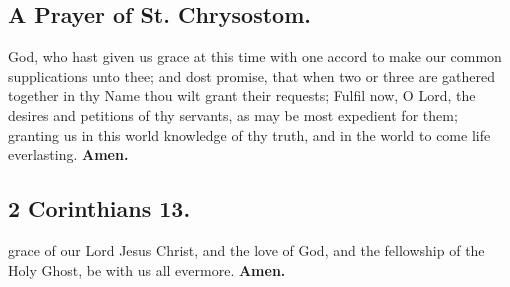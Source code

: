 \subsection{A Prayer of St. Chrysostom.}

 God, who hast given us grace at this time with one accord to make our common supplications unto thee; and dost promise, that when two or three are gathered together in thy Name thou wilt grant their requests; Fulfil now, O Lord, the desires and petitions of thy servants, as may be most expedient for them; granting us in this world knowledge of thy truth, and in the world to come life everlasting.
\textbf{Amen.}

\subsection{2 Corinthians 13.}

 grace of our Lord Jesus Christ, and the love of God, and the fellowship of the Holy Ghost, be with us all evermore.
\textbf{Amen.}
